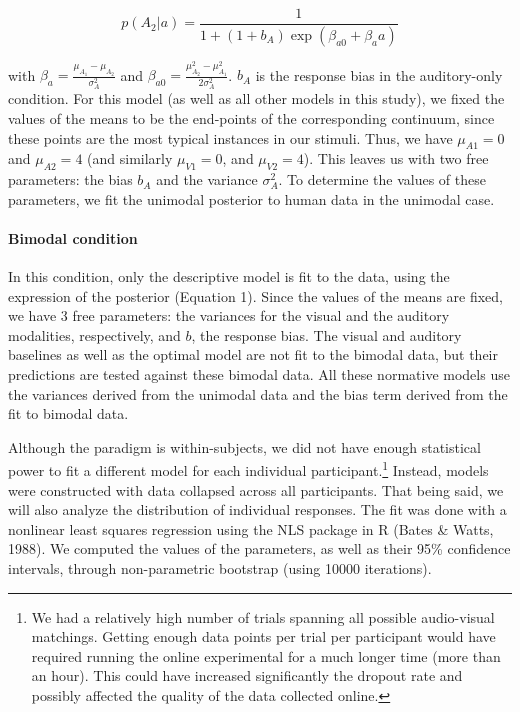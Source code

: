 \documentclass[english,floatsintext,man]{apa6}
\theoremstyle{definition}
\theoremstyle{definition}
\theoremstyle{definition}
\theoremstyle{remark}
\begin{document}
\[p(A_2 | a)=\frac{1}{1+(1+b_A)\exp(\beta_{a0}+\beta_aa)}\]

with \(\beta_a=\frac{\mu_{A_1}-\mu_{A_2}}{\sigma^2_{A}}\) and
\(\beta_{a0}=\frac{\mu^2_{A_2}-\mu^2_{A_1}}{2\sigma^2_{A}}\). \(b_A\) is
the response bias in the auditory-only condition. For this model (as
well as all other models in this study), we fixed the values of the
means to be the end-points of the corresponding continuum, since these
points are the most typical instances in our stimuli. Thus, we have
\(\mu_{A1}=0\) and \(\mu_{A2}=4\) (and similarly \(\mu_{V1}=0\), and
\(\mu_{V2}=4\)). This leaves us with two free parameters: the bias
\(b_A\) and the variance \(\sigma^2_{A}\). To determine the values of
these parameters, we fit the unimodal posterior to human data in the
unimodal case.

\paragraph{Bimodal condition}\label{bimodal-condition}

In this condition, only the descriptive model is fit to the data, using
the expression of the posterior (Equation 1). Since the values of the
means are fixed, we have 3 free parameters: the variances for the visual
and the auditory modalities, respectively, and \(b\), the response bias.
The visual and auditory baselines as well as the optimal model are not
fit to the bimodal data, but their predictions are tested against these
bimodal data. All these normative models use the variances derived from
the unimodal data and the bias term derived from the fit to bimodal
data.

Although the paradigm is within-subjects, we did not have enough
statistical power to fit a different model for each individual
participant.\footnote{We had a relatively high number of trials spanning
  all possible audio-visual matchings. Getting enough data points per
  trial per participant would have required running the online
  experimental for a much longer time (more than an hour). This could
  have increased significantly the dropout rate and possibly affected
  the quality of the data collected online.} Instead, models were
constructed with data collapsed across all participants. That being
said, we will also analyze the distribution of individual responses. The
fit was done with a nonlinear least squares regression using the NLS
package in R (Bates \& Watts, 1988). We computed the values of the
parameters, as well as their 95\% confidence intervals, through
non-parametric bootstrap (using 10000 iterations).
\end{document}
